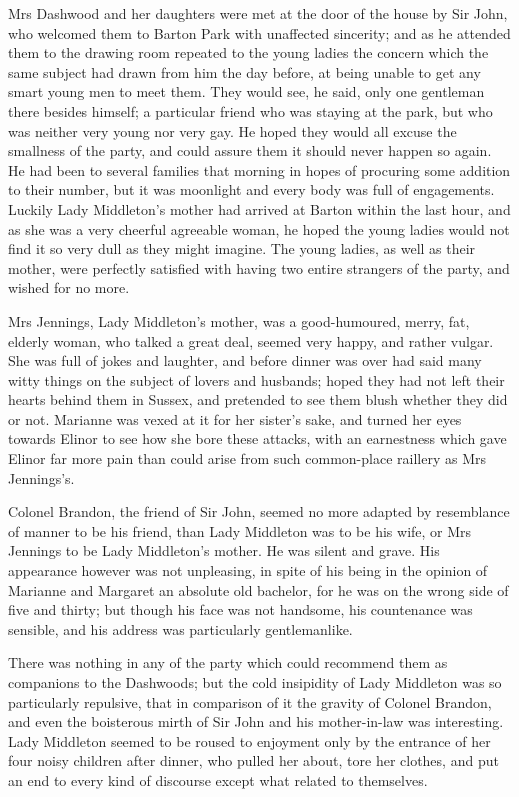Mrs Dashwood and her daughters were met at the door of the house by Sir John, who welcomed them to Barton Park with unaffected sincerity; and as he attended them to the drawing room repeated to the young ladies the concern which the same subject had drawn from him the day before, at being unable to get any smart young men to meet them. They would see, he said, only one gentleman there besides himself; a particular friend who was staying at the park, but who was neither very young nor very gay. He hoped they would all excuse the smallness of the party, and could assure them it should never happen so again. He had been to several families that morning in hopes of procuring some addition to their number, but it was moonlight and every body was full of engagements. Luckily Lady Middleton’s mother had arrived at Barton within the last hour, and as she was a very cheerful agreeable woman, he hoped the young ladies would not find it so very dull as they might imagine. The young ladies, as well as their mother, were perfectly satisfied with having two entire strangers of the party, and wished for no more.

Mrs Jennings, Lady Middleton’s mother, was a good-humoured, merry, fat, elderly woman, who talked a great deal, seemed very happy, and rather vulgar. She was full of jokes and laughter, and before dinner was over had said many witty things on the subject of lovers and husbands; hoped they had not left their hearts behind them in Sussex, and pretended to see them blush whether they did or not. Marianne was vexed at it for her sister’s sake, and turned her eyes towards Elinor to see how she bore these attacks, with an earnestness which gave Elinor far more pain than could arise from such common-place raillery as Mrs Jennings’s.

Colonel Brandon, the friend of Sir John, seemed no more adapted by resemblance of manner to be his friend, than Lady Middleton was to be his wife, or Mrs Jennings to be Lady Middleton’s mother. He was silent and grave. His appearance however was not unpleasing, in spite of his being in the opinion of Marianne and Margaret an absolute old bachelor, for he was on the wrong side of five and thirty; but though his face was not handsome, his countenance was sensible, and his address was particularly gentlemanlike.

There was nothing in any of the party which could recommend them as companions to the Dashwoods; but the cold insipidity of Lady Middleton was so particularly repulsive, that in comparison of it the gravity of Colonel Brandon, and even the boisterous mirth of Sir John and his mother-in-law was interesting. Lady Middleton seemed to be roused to enjoyment only by the entrance of her four noisy children after dinner, who pulled her about, tore her clothes, and put an end to every kind of discourse except what related to themselves.

